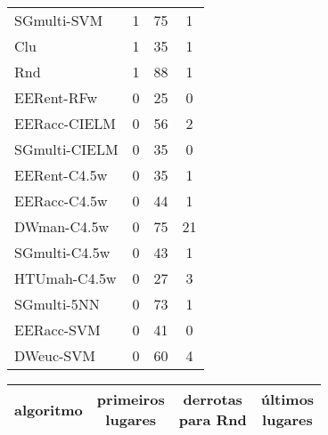\begin{table}[h]
\begin{center}
{\begin{tabular}{lccc}
SGmulti-SVM & 1 & 75 & 1 \\
Clu        & 1 & 35 & 1 \\
Rnd        & 1 & 88 & 1 \\
EERent-RFw & 0 & 25 & 0 \\
EERacc-CIELM & 0 & 56 & 2 \\
SGmulti-CIELM & 0 & 35 & 0 \\
EERent-C4.5w & 0 & 35 & 1 \\
EERacc-C4.5w & 0 & 44 & 1 \\
DWman-C4.5w & 0 & 75 & 21 \\
SGmulti-C4.5w & 0 & 43 & 1 \\
HTUmah-C4.5w & 0 & 27 & 3 \\
SGmulti-5NN & 0 & 73 & 1 \\
EERacc-SVM & 0 & 41 & 0 \\
DWeuc-SVM  & 0 & 60 & 4 \\
\end{tabular}
\begin{tabular}{lccc}
algoritmo & \makecell{primeiros\\lugares} & \makecell{derrotas\\para Rnd}  & \makecell{últimos\\lugares} \\
\hline
               

\end{tabular}}
\end{center}
\end{table}
